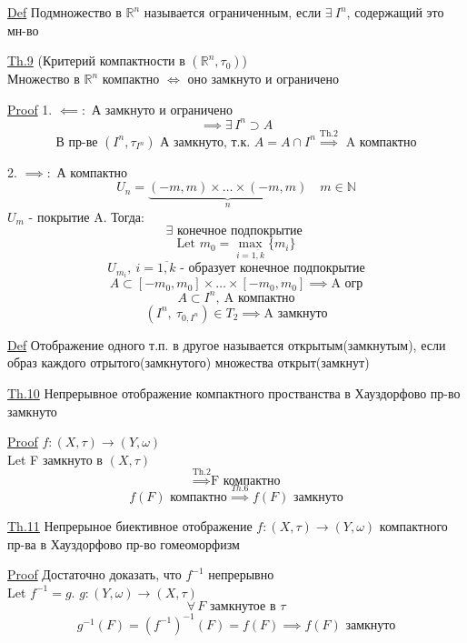 \documentclass[a4paper]{article}
\begin{document}
\begin{tcolorbox}
\underline{Def} Подмножество в $ \mathbb{R}^{n} $ называется ограниченным, если
$ \exists \ I^{n} $, содержащий это мн-во
\end{tcolorbox}

\begin{tcolorbox}
\underline{Th.9} (Критерий компактности в $ (\mathbb{R}^{n}, \tau_0) $)\\
Множество в $ \mathbb{R}^{n} $ компактно $ \iff $ оно замкнуто и ограничено

\underline{Proof} 1. $ \impliedby: $ А замкнуто и ограничено
\[
    \implies \exists \, I^{n} \supset A
\]
\[
    \text{В пр-ве } (I^{n}, \tau_{I^{n}}) \text{ А замкнуто, т.к. } A = A \cap I^{n}
    \stackrel{\text{Th.2}}{\implies} \text{ A компактно}
\]

2. $ \implies: $ А компактно
\[
    U_n = \underbrace{(-m, m) \times \dots \times (-m, m)}_{n} \quad m \in \mathbb{N}
\]
$ U_m $ - покрытие A. Тогда:
\[
    \exists \text{ конечное подпокрытие }
\]
\[
    \text{Let } m_0 = \max_{i = \overline{1,k}} \{ m_i \}
\]
\[
    U_{m_i}, \ i = \overline{1, k} \text{ - образует конечное подпокрытие}
\]
\[
    A \subset [-m_0, m_0] \times \dots \times [-m_0, m_0] \implies \text{A огр}
\]
\[
    A \subset I^{n}, \ \text{A компактно}
\]
\[
    (I^{n}, \ \tau_{0, I^{n}}) \in T_2 \implies \text{A замкнуто}
\]
\end{tcolorbox}

\begin{tcolorbox}
\underline{Def} Отображение одного т.п. в другое называется открытым(замкнутым),
если образ каждого отрытого(замкнутого) множества открыт(замкнут)
\end{tcolorbox}

\begin{tcolorbox}
\underline{Th.10} Непрерывное отображение компактного простванства в Хауздорфово
пр-во замкнуто

\underline{Proof} $ f: (X,\tau) \to (Y, \omega) $\\ 
Let F замкнуто в $ (X, \tau) $  
\[
    \stackrel{\text{Th.2}}{\implies} \text{F компактно}
\]
\[
    f(F) \text{ компактно} \stackrel{Th.6}{\implies} f(F) \text{ замкнуто}
\]
\end{tcolorbox}

\begin{tcolorbox}
\underline{Th.11} Непрерыное биективное отображение $ f: (X,\tau) \to (Y, \omega) $ 
компактного пр-ва в Хауздорфово пр-во гомеоморфизм

\underline{Proof} Достаточно доказать, что $ f^{-1} $ непрерывно\\
Let $ f^{-1} = g $. $ g: (Y, \omega) \to (X,\tau) $  
\[
    \forall \, F \text{ замкнутое в } \tau
\]
\[
    g^{-1}(F) = (f^{-1})^{-1}(F) = f(F) \implies f(F) \text{ замкнуто}
\]
\end{tcolorbox}
\end{document}
